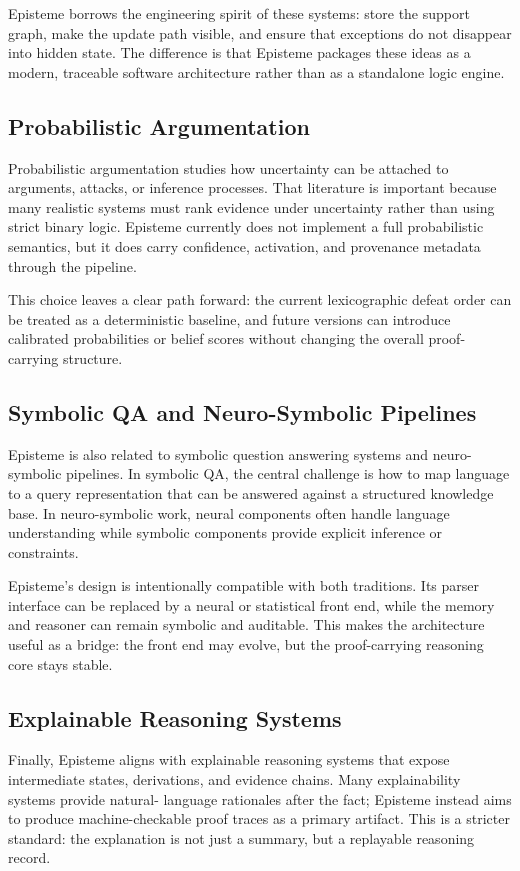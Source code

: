 \documentclass[11pt]{article}
\begin{document}
Episteme borrows the engineering spirit of these systems: store the support graph,
make the update path visible, and ensure that exceptions do not disappear into hidden
state. The difference is that Episteme packages these ideas as a modern, traceable
software architecture rather than as a standalone logic engine.

\subsection{Probabilistic Argumentation}
Probabilistic argumentation studies how uncertainty can be attached to arguments,
attacks, or inference processes. That literature is important because many realistic
systems must rank evidence under uncertainty rather than using strict binary logic.
Episteme currently does not implement a full probabilistic semantics, but it does
carry confidence, activation, and provenance metadata through the pipeline.

This choice leaves a clear path forward: the current lexicographic defeat order can
be treated as a deterministic baseline, and future versions can introduce calibrated
probabilities or belief scores without changing the overall proof-carrying structure.

\subsection{Symbolic QA and Neuro-Symbolic Pipelines}
Episteme is also related to symbolic question answering systems and neuro-symbolic
pipelines. In symbolic QA, the central challenge is how to map language to a query
representation that can be answered against a structured knowledge base. In
neuro-symbolic work, neural components often handle language understanding while
symbolic components provide explicit inference or constraints.

Episteme's design is intentionally compatible with both traditions. Its parser
interface can be replaced by a neural or statistical front end, while the memory and
reasoner can remain symbolic and auditable. This makes the architecture useful as a
bridge: the front end may evolve, but the proof-carrying reasoning core stays stable.

\subsection{Explainable Reasoning Systems}
Finally, Episteme aligns with explainable reasoning systems that expose intermediate
states, derivations, and evidence chains. Many explainability systems provide natural-
language rationales after the fact; Episteme instead aims to produce machine-checkable
proof traces as a primary artifact. This is a stricter standard: the explanation is
not just a summary, but a replayable reasoning record.
\end{document}
